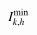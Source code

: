 

    \[\let\par\empty

    
{{{{\miitalic{I}}}\sb{{{\miitalic{k}}{\miitalic{,}}{\miitalic{h}}}}\sp{{\minormal{min}}}}}


    \]

  